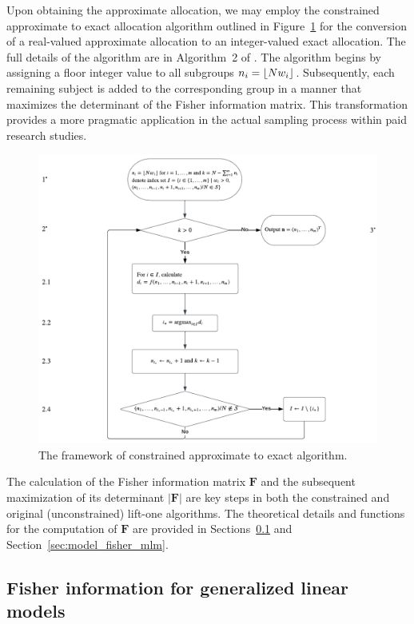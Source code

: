 Upon obtaining the approximate allocation, we may employ the constrained approximate to exact allocation algorithm outlined in Figure~\ref{fig:approx_to_exact_algo} for the conversion of a real-valued approximate allocation to an integer-valued exact allocation. The full details of the algorithm are in Algorithm~2 of \citet{huang2023constrained}. The algorithm begins by assigning a floor integer value to all subgroups $n_i = \lfloor Nw_i\rfloor$. Subsequently, each remaining subject is added to the corresponding group in a manner that maximizes the determinant of the Fisher information matrix. This transformation provides a more pragmatic application in the actual sampling process within paid research studies.

\begin{figure}[htb!]
  \centering
  \includegraphics[width=\textwidth]{figures/approx_to_exact.png}
  \caption{The framework of constrained approximate to exact algorithm.}
  \label{fig:approx_to_exact_algo}
\end{figure}

The calculation of the Fisher information matrix $\mathbf{F}$ and the subsequent maximization of its determinant $|\mathbf{F}|$ are key steps in both the constrained and original (unconstrained) lift-one algorithms. The theoretical details and functions for the computation of $\mathbf{F}$ are provided in Sections~\ref{sec:model_fisher_glm} and Section~\ref{sec:model_fisher_mlm}.

\subsection{Fisher information for generalized linear models} \label{sec:model_fisher_glm}

